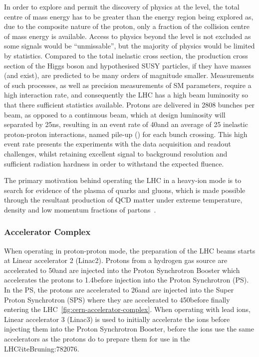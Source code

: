 In order to explore and permit the discovery of physics at the \TeV level, the total centre of mass energy has to be greater than the energy region being explored as, due to the composite nature of the proton, only a fraction of the collision centre of mass energy is available.
Access to physics beyond the \TeV level is not excluded	as some signals would be ``unmissable'', but the majority of physics would be limited by statistics.
Compared to the total inelastic cross section, the production cross section of the Higgs boson and hypothesised SUSY particles, if they have \TeV masses (and exist), are predicted to be many orders of magnitude smaller.
Measurements of such processes, as well as precision measurements of SM parameters, require a high interaction rate, and consequently the LHC has a high beam luminosity so that there sufficient statistics available.
Protons are delivered in 2808 bunches per beam, as opposed to a continuous beam, which at design luminosity will separated by 25ns, resulting in an event rate of 40\MHz and an average of 25 inelastic proton-proton interactions, named pile-up (\PU) for each bunch crossing. 
This high event rate presents the experiments with the data acquisition and readout challenges, whilst retaining excellent signal to background resolution and sufficient radiation hardness in order to withstand the expected fluence.

The primary motivation behind operating the LHC in a heavy-ion mode is to search for evidence of the plasma of quarks and gluons, which is made possible through the resultant production of QCD matter under extreme temperature, density and low momentum fractions of partons~\cite{Baur:687318}.

\subsubsection{Accelerator Complex}
When operating in proton-proton mode, the preparation of the LHC beams starts at Linear accelerator 2 (Linac2). 
Protons from a hydrogen gas source are accelerated to 50\MeV and are injected into the Proton Synchrotron Booster which accelerates the protons to 1.4\GeV before injection into the Proton Synchrotron (PS). 
In the PS, the protons are accelerated to 26\GeV and are injected into the Super Proton Synchrotron (SPS) where they are accelerated to 450\GeV before finally entering the LHC~\ref{fig:cern-accelerator-complex}. 
When operating with lead ions, Linear accelerator 3 (Linac3) is used to initially accelerate the ions before injecting them into the Proton Synchrotron Booster, before the ions use the same accelerators as the protons do to prepare them for use in the LHC\~cite{Bruning:782076}. 

